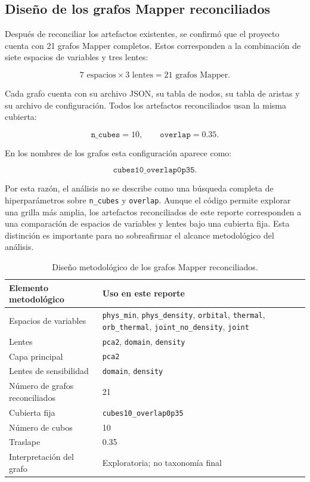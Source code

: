 \subsection*{Diseño de los grafos Mapper reconciliados}

Después de reconciliar los artefactos existentes, se confirmó que el proyecto cuenta con 21 grafos Mapper completos. Estos corresponden a la combinación de siete espacios de variables y tres lentes:

\[
7 \text{ espacios} \times 3 \text{ lentes} = 21 \text{ grafos Mapper}.
\]

Cada grafo cuenta con su archivo JSON, su tabla de nodos, su tabla de aristas y su archivo de configuración. Todos los artefactos reconciliados usan la misma cubierta:

\[
\texttt{n\_cubes}=10,\qquad \texttt{overlap}=0.35.
\]

En los nombres de los grafos esta configuración aparece como:

\[
\texttt{cubes10\_overlap0p35}.
\]

Por esta razón, el análisis no se describe como una búsqueda completa de hiperparámetros sobre \texttt{n\_cubes} y \texttt{overlap}. Aunque el código permite explorar una grilla más amplia, los artefactos reconciliados de este reporte corresponden a una comparación de espacios de variables y lentes bajo una cubierta fija. Esta distinción es importante para no sobreafirmar el alcance metodológico del análisis.

\begin{table}[H]
\centering
\small
\begin{tabular}{p{}p{}}
\toprule
\textbf{Elemento metodológico} & \textbf{Uso en este reporte} \\
\midrule
Espacios de variables & \texttt{phys\_min}, \texttt{phys\_density}, \texttt{orbital}, \texttt{thermal}, \texttt{orb\_thermal}, \texttt{joint\_no\_density}, \texttt{joint} \\
Lentes & \texttt{pca2}, \texttt{domain}, \texttt{density} \\
Capa principal & \texttt{pca2} \\
Lentes de sensibilidad & \texttt{domain}, \texttt{density} \\
Número de grafos reconciliados & 21 \\
Cubierta fija & \texttt{cubes10\_overlap0p35} \\
Número de cubos & 10 \\
Traslape & 0.35 \\
Interpretación del grafo & Exploratoria; no taxonomía final \\
\bottomrule
\end{tabular}
\caption{Diseño metodológico de los grafos Mapper reconciliados.}
\label{tab:mapper_design}
\end{table}

